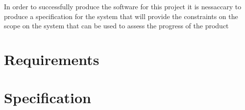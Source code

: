 In order to successfully produce the software for this project it is nessaccary to produce a specification for the system
that will provide the constraints on the scope on the system that can be used to assess the progress of the product

\section{Requirements}

\section{Specification}

